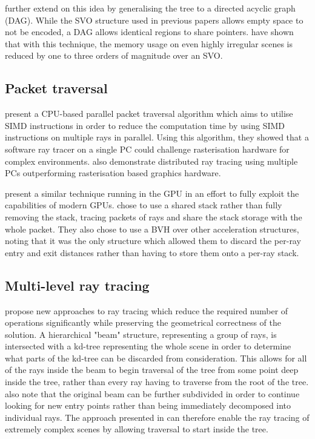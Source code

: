 \cite{kampe2013dags} further extend on this idea by generalising the tree to a directed acyclic graph (DAG). While the SVO structure used in previous papers allows empty space to not be encoded, a DAG allows identical regions to share pointers. \citeauthor{kampe2013dags} have shown that with this technique, the memory usage on even highly irregular scenes is reduced by one to three orders of magnitude over an SVO.

\subsection{Packet traversal}
\cite{wald01interactiverendering} present a CPU-based parallel packet traversal algorithm which aims to utilise SIMD instructions in order to reduce the computation time by using SIMD instructions on multiple rays in parallel. Using this algorithm, they showed that a software ray tracer on a single PC could challenge rasterisation hardware for complex environments. \citeauthor{wald01interactiverendering} also demonstrate distributed ray tracing using multiple PCs outperforming rasterisation based graphics hardware.

\cite{gunther07bvhpacket} present a similar technique running in the GPU in an effort to fully exploit the capabilities of modern GPUs. \cite{gunther07bvhpacket} chose to use a shared stack rather than fully removing the stack, tracing packets of rays and share the stack storage with the whole packet. They also chose to use a BVH over other acceleration structures, noting that it was the only structure which allowed them to discard the per-ray entry and exit distances rather than having to store them onto a per-ray stack.

\subsection{Multi-level ray tracing}
\cite{reshetov05mrta} propose new approaches to ray tracing which reduce the required number of operations significantly while preserving the geometrical correctness of the solution. A hierarchical "beam" structure, representing a group of rays, is intersected with a kd-tree representing the whole scene in order to determine what parts of the kd-tree can be discarded from consideration. This allows for all of the rays inside the beam to begin traversal of the tree from some point deep inside the tree, rather than every ray having to traverse from the root of the tree. \citeauthor{reshetov05mrta} also note that the original beam can be further subdivided in order to continue looking for new entry points rather than being immediately decomposed into individual rays. The approach presented in \cite{reshetov05mrta} can therefore enable the ray tracing of extremely complex scenes by allowing traversal to start inside the tree.

